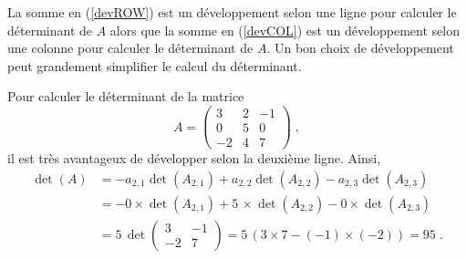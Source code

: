{La somme en (\ref{devROW}) est un développement selon une ligne pour
calculer le déterminant de $A$ alors que la somme en (\ref{devCOL})
est un développement selon une colonne pour calculer le déterminant de
$A$.  Un bon choix de développement peut grandement simplifier le
calcul du déterminant.

\begin{egg}
Pour calculer le déterminant de la matrice
\[
A= \begin{pmatrix} 3 & 2 & -1 \\ 0 & 5 & 0 \\
-2 & 4 & 7 \end{pmatrix} \; ,
\]
il est très avantageux de développer selon la deuxième ligne.  Ainsi,
\begin{align*}
\det(A) &= -a_{2,1} \det(A_{2,1}) + a_{2,2} \det(A_{2,2})
- a_{2,3}\det(A_{2,3}) \\
&= -0\times \det(A_{2,1}) + 5\,\times \det(A_{2,2}) - 0\times \det(A_{2,3}) \\
&= 5\, \det\begin{pmatrix} 3 & -1 \\ -2 & 7 \end{pmatrix}
= 5\,(3\times 7 - (-1)\times (-2)) = 95 \; .
\end{align*}


\end{egg}}
